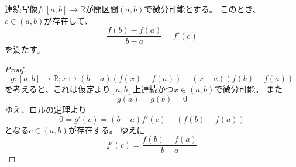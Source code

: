 \begin{theorem}[平均値の定理]
  連続写像$f:[a,b]\to\mathbb{R}$が開区間$(a,b)$で微分可能とする。
  このとき、$c\in(a,b)$が存在して、
  \[
    \frac{f(b)-f(a)}{b-a}=f'(c)
  \]
  を満たす。
\end{theorem}
\begin{proof}
  \[
    g:[a,b]\to\mathbb{R};x\mapsto (b-a)(f(x)-f(a))-(x-a)(f(b)-f(a))
  \]
  を考えると、これは仮定より$[a,b]$上連続かつ$x\in(a,b)$で微分可能。
  また
  \[
    g(a)=g(b)=0
  \]
  ゆえ、ロルの定理より
  \[
    0=g'(c)=(b-a)f'(c)-(f(b)-f(a))
  \]
  となる$c\in(a,b)$が存在する。
  ゆえに
  \[
    f'(c)=\frac{f(b)-f(a)}{b-a}
  \]
\end{proof}
